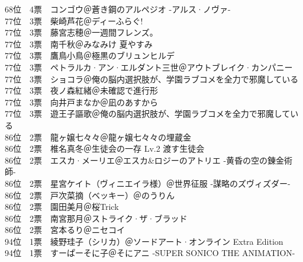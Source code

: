 {    68位　4票　コンゴウ＠蒼き鋼のアルペジオ -アルス·ノヴァ-                                              \\
    77位　3票　柴崎芦花＠ディーふらぐ!                                                                    \\
    77位　3票　藤宮志穂＠一週間フレンズ。                                                                 \\
    77位　3票　南千秋＠みなみけ 夏やすみ                                                                  \\
    77位　3票　鷹鳥小鳥＠極黒のブリュンヒルデ                                                             \\
    77位　3票　ペトラルカ·アン·エルダント三世＠アウトブレイク·カンパニー                               \\
    77位　3票　ショコラ＠俺の脳内選択肢が、学園ラブコメを全力で邪魔している                               \\
    77位　3票　夜ノ森紅緒＠未確認で進行形                                                                 \\
    77位　3票　向井戸まなか＠凪のあすから                                                                 \\
    77位　3票　遊王子謳歌＠俺の脳内選択肢が、学園ラブコメを全力で邪魔している                             \\
    86位　2票　龍ヶ嬢七々々＠龍ヶ嬢七々々の埋蔵金                                                         \\
    86位　2票　椎名真冬＠生徒会の一存 Lv.2 渡す生徒会                                                     \\
    86位　2票　エスカ·メーリエ＠エスカ\&ロジーのアトリエ -黄昏の空の錬金術師-                            \\
    86位　2票　星宮ケイト（ヴィニエイラ様）＠世界征服 -謀略のズヴィズダー-                                \\
    86位　2票　戸次菜摘（ベッキー）＠のうりん                                                             \\
    86位　2票　園田美月＠桜Trick                                                                          \\
    86位　2票　南宮那月＠ストライク·ザ·ブラッド                                                         \\
    86位　2票　宮本るり＠ニセコイ                                                                         \\
    94位　1票　綾野珪子（シリカ）＠ソードアート·オンライン Extra Edition                                 \\
    94位　1票　すーぱーそに子＠そにアニ -SUPER SONICO THE ANIMATION-                                      \\
}

